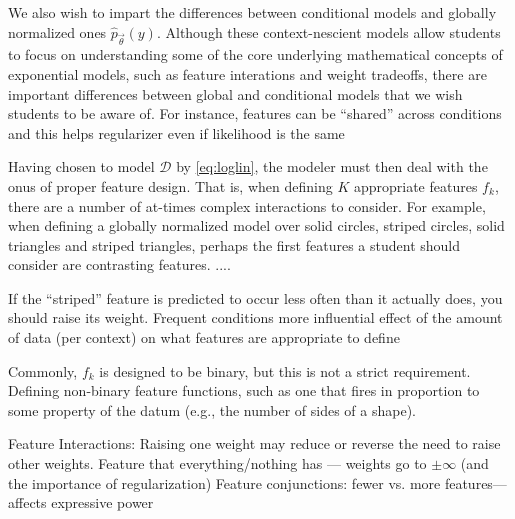 \documentclass[11pt,letterpaper]{article}
\newcommand{\Data}[0]{\ensuremath{\mathcal{D}}}
\begin{document}
We also wish to impart the differences between conditional models and globally normalized ones 
$\hat{p}_{\vec{\theta}}\left(y\right)$. Although these context-nescient models allow students 
to focus on understanding some of the core underlying mathematical concepts of 
exponential models, such as feature interations and weight tradeoffs, there are important differences
between global and conditional models that we wish students to be aware of. For instance, 
features can be ``shared'' across conditions and this helps regularizer even if likelihood is the same

Having chosen to model $\Data{}$ by \eqref{eq:loglin}, the modeler must then deal with the 
onus of proper feature design. That is, when defining $K$ appropriate features $f_k$, there 
are a number of at-times complex interactions to consider. For example, when defining a globally normalized model 
over solid circles, striped circles, solid triangles and striped triangles, perhaps the first features 
a student should consider are contrasting features. ....

If the “striped” feature is predicted to occur less often than it actually does, you should raise its weight. 
Frequent conditions more influential
effect of the amount of data (per context) on what features are appropriate to define

Commonly, $f_k$ is designed to be binary, but this is not a strict requirement. Defining non-binary feature
functions, such as one that fires in proportion to some property of the datum (e.g., the number of sides of
a shape).


Feature Interactions: Raising one weight may reduce or reverse the need to raise other weights. 
Feature that everything/nothing has --- weights go to $\pm \infty$ (and the importance of regularization)
Feature conjunctions: fewer vs. more features---affects expressive power
\end{document}
